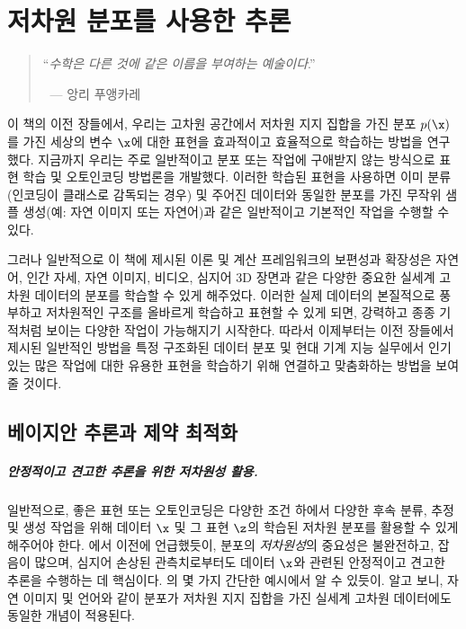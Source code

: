 \documentclass[../../book-main_ko.tex]{subfiles}
\begin{document}
\chapter{저차원 분포를 사용한 추론}
\label{ch:conditional-inference}

\begin{quote}

\hfill    ``{\em 수학은 다른 것에 같은 이름을 부여하는 예술이다}.''

$~$ \hfill --- 앙리 푸앵카레
\end{quote}
\vspace{5mm} 


이 책의 이전 장들에서, 우리는 고차원 공간에서 저차원 지지 집합을 가진 분포 $p(\x)$를 가진 세상의 변수 $\x$에 대한 표현을 효과적이고 효율적으로 학습하는 방법을 연구했다. 지금까지 우리는 주로 일반적이고 분포 또는 작업에 구애받지 않는 방식으로 표현 학습 및 오토인코딩 방법론을 개발했다. 이러한 학습된 표현을 사용하면 이미 분류(인코딩이 클래스로 감독되는 경우) 및 주어진 데이터와 동일한 분포를 가진 무작위 샘플 생성(예: 자연 이미지 또는 자연어)과 같은 일반적이고 기본적인 작업을 수행할 수 있다.

그러나 일반적으로 이 책에 제시된 이론 및 계산 프레임워크의 보편성과 확장성은 자연어, 인간 자세, 자연 이미지, 비디오, 심지어 3D 장면과 같은 다양한 중요한 실세계 고차원 데이터의 분포를 학습할 수 있게 해주었다. 이러한 실제 데이터의 본질적으로 풍부하고 저차원적인 구조를 올바르게 학습하고 표현할 수 있게 되면, 강력하고 종종 기적처럼 보이는 다양한 작업이 가능해지기 시작한다. 따라서 이제부터는 이전 장들에서 제시된 일반적인 방법을 특정 구조화된 데이터 분포 및 현대 기계 지능 실무에서 인기 있는 많은 작업에 대한 유용한 표현을 학습하기 위해 연결하고 맞춤화하는 방법을 보여줄 것이다.

\section{베이지안 추론과 제약 최적화}
\paragraph{안정적이고 견고한 추론을 위한 저차원성 활용.}일반적으로, 좋은 표현 또는 오토인코딩은 다양한 조건 하에서 다양한 후속 분류, 추정 및 생성 작업을 위해 데이터 $\x$ 및 그 표현 $\z$의 학습된 저차원 분포를 활용할 수 있게 해주어야 한다.  에서 이전에 언급했듯이, 분포의 {\em 저차원성}의 중요성은 불완전하고, 잡음이 많으며, 심지어 손상된 관측치로부터도 데이터 $\x$와 관련된 안정적이고 견고한 추론을 수행하는 데 핵심이다. 의 몇 가지 간단한 예시에서 알 수 있듯이. 알고 보니, 자연 이미지 및 언어와 같이 분포가 저차원 지지 집합을 가진 실세계 고차원 데이터에도 동일한 개념이 적용된다.
\end{document}
